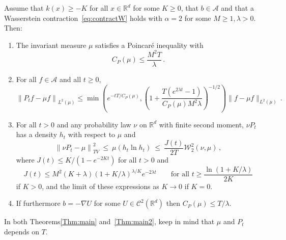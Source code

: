 \documentclass[AHL,Unicode,longabstracts,published]{cedram}
\newcommand{\R}{\mathbb R}
\newcommand{\A}{\mathcal A}
\newcommand{\clC}{\mathcal C}
\newcommand{\clW}{\mathcal W}
\newcommand{\na}{\nabla}
\newcommand{\1}{\mathbbm{1}}
\newcommand{\nv}[1]{#1}
\newcommand{\R}{\mathbb R}
\newcommand{\clW}{\mathcal W}
\begin{document}
\begin{theo}\label{Thm:main2}
Assume that $k(x) \geqslant - K$ for all $x\in\R^d$ for some $K\geqslant 0$, that $b\in\A$ and that a Wasserstein contraction~\eqref{eq:contractW} holds with $\alpha=2$ for some $M\geqslant1,\lambda>0$. Then:
\begin{enumerate}
\item The invariant measure $\mu$ satisfies a Poincaré inequality with
\[
C_P(\mu) \leqslant \frac{M^2 T}{\lambda}\,.
\]
\item For all $f\in \A$ and all $t\geqslant 0$,
\begin{equation}\label{eq:Variancedecay}
\left\|P_t f -\mu f\right\|_{L^2(\mu)} \leqslant \min \left( e^{-tT/C_P(\mu)}, \left( 1+ \nv{\frac{T\left(e^{2\lambda t}-1\right)}{C_P(\mu)M^2\lambda }}\right)^{\nv{-1/2}}\right) \|f -\mu f\|_{L^2(\mu)}\,.
\end{equation}
\item For all $t>0$ and \nv{any} probability law $\nu$ on $\R^d$ with finite second moment, $\nu P_t$ has a density $h_t$ with respect to $\mu$ and
\begin{equation}\label{eq:thm2Wang}
\left\|\nu P_t - \mu\right\|_{TV}^2 \ \leqslant\ \mu (h_t\ln h_t) \ \leqslant \ \frac{J(t)}{2T} \clW_2^2(\nu,\mu)\,,
\end{equation}
where $J(t) \leqslant K/(1-e^{-2Kt})$ for all $t> 0$ and
\[
J(t) \leqslant M^2 (K+\lambda) \left( 1+K/\lambda\right)^{\lambda/K}e^{-2\lambda t}\qquad \text{for all } t \geqslant \frac{\ln(1+K/\lambda)}{2K}
\]
if $K>0$, and the limit of these expressions as $K\rightarrow 0$ if $K=0$.
\item If furthermore $b=-\na U$ for some $U\in\clC^2(\R^d)$ then $C_P(\mu)\leqslant T/\lambda$.
\end{enumerate}
\end{theo}

In both Theorems\ref{Thm:main} and~\ref{Thm:main2}, keep in mind that $\mu$ and $P_t$ depends on $T$.
\end{document}
